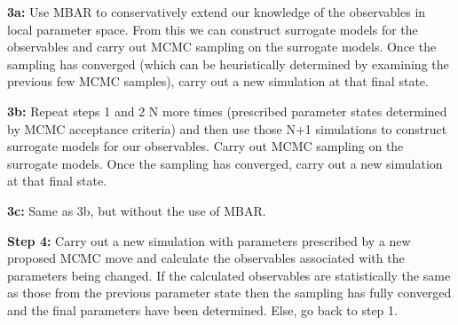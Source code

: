 \documentclass{report}
\begin{document}
\begin{outline}
\begin{outline}
\begin{outline}
\begin{outline}
\begin{outline}
          \begin{outline}
            \item{\textbf{3a:} Use MBAR to conservatively extend our knowledge of the observables in local parameter space. From this 
we can construct 
                  surrogate models for the observables and carry out MCMC sampling on the surrogate models. 
Once the sampling has converged (which can be
                  heuristically determined by examining the previous few MCMC samples), carry out a new simulation at that final state.}
            \item{\textbf{3b:} Repeat steps 1 and 2 N more times (prescribed parameter states determined by MCMC acceptance criteria) and then use those N+1
                  simulations to construct surrogate models for our observables. Carry out MCMC sampling on the surrogate models. Once the sampling has 
                  converged, carry out a new simulation at that final state.}
            \item{\textbf{3c:} Same as 3b, but without the use of MBAR.}
          \end{outline} 
          \item{\textbf{Step 4:} Carry out a new simulation with parameters prescribed by a new proposed MCMC move and calculate the observables associated 
                with the parameters being changed. If the calculated observables are statistically the same as those from the previous parameter state then
                the sampling has fully converged and the final parameters have been determined. Else, go back to step 1.} 
        \end{outline} 
      \end{outline}   
    \end{outline}
  \end{outline}
      

\end{outline}
\end{document}
